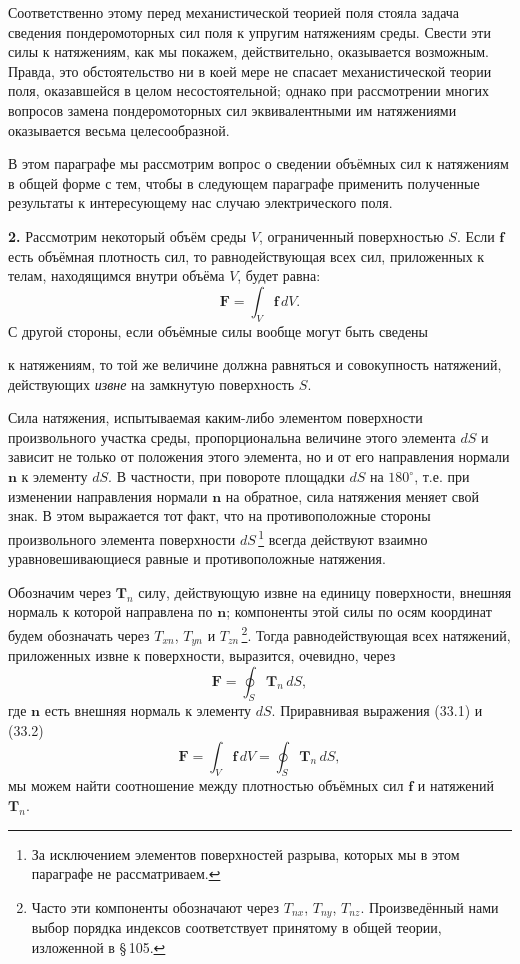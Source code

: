 \documentclass[a4paper,12pt]{article}
\begin{document}
Соответственно этому перед механистической теорией поля стояла задача
сведения пондеромоторных сил поля к упругим натяжениям среды. Свести
эти силы к натяжениям, как мы покажем, действительно, оказывается
возможным. Правда, это обстоятельство ни в коей мере не спасает
механистической теории поля, оказавшейся в целом несостоятельной;
однако при рассмотрении многих вопросов замена пондеромоторных сил
эквивалентными им натяжениями оказывается весьма целесообразной.

В этом параграфе мы рассмотрим вопрос о сведении объёмных сил
к натяжениям в общей форме с тем, чтобы в следующем параграфе применить
полученные результаты к интересующему нас случаю электрического поля.

\textbf{2.} Рассмотрим некоторый объём среды $V$, ограниченный
поверхностью $S$. Если $\mathbf{f}$ есть объёмная плотность сил, то
равнодействующая всех сил, приложенных к телам, находящимся внутри
объёма $V$, будет равна:
\begin{equation}
    \mathbf{F} = \int_V \mathbf{f}\,dV.
    \tag{33.1}
\end{equation}
С другой стороны, если объёмные силы вообще могут быть сведены


к натяжениям, то той же величине должна равняться и совокупность
натяжений, действующих \textit{извне} на замкнутую поверхность $S$.

Сила натяжения, испытываемая каким-либо элементом поверхности
произвольного участка среды, пропорциональна величине этого элемента
$dS$ и зависит не только от положения этого элемента, но и от его
направления нормали $\mathbf{n}$ к элементу $dS$. В частности, при
повороте площадки $dS$ на $180^\circ$, т.е. при изменении направления
нормали $\mathbf{n}$ на обратное, сила натяжения меняет свой знак.
В этом выражается тот факт, что на противоположные стороны
произвольного элемента поверхности $dS$\,\footnote{За исключением
элементов поверхностей разрыва, которых мы в этом параграфе не
рассматриваем.} всегда действуют взаимно уравновешивающиеся равные
и противоположные натяжения.

Обозначим через $\mathbf{T}_n$ силу, действующую извне на единицу
поверхности, внешняя нормаль к которой направлена по $\mathbf{n}$;
компоненты этой силы по осям координат будем обозначать через $T_{xn}$,
$T_{yn}$ и $T_{zn}$\,\footnote{Часто эти компоненты обозначают через
$T_{nx}$, $T_{ny}$, $T_{nz}$. Произведённый нами выбор порядка
индексов соответствует принятому в общей теории, изложенной в
§\,105.}. Тогда равнодействующая всех натяжений, приложенных извне
к поверхности, выразится, очевидно, через
\begin{equation}
    \mathbf{F} = \oint_S \mathbf{T}_n\,dS,
    \tag{33.2}
\end{equation}
где $\mathbf{n}$ есть внешняя нормаль к элементу $dS$. Приравнивая
выражения (33.1) и (33.2)
\begin{equation}
    \mathbf{F} = \int_V \mathbf{f}\,dV = \oint_S \mathbf{T}_n\,dS,
    \tag{33.3}
\end{equation}
мы можем найти соотношение между плотностью объёмных сил $\mathbf{f}$
и натяжений $\mathbf{T}_n$.
\end{document}
